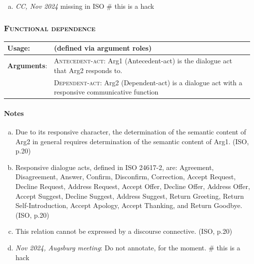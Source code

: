 \documentclass{udisc}
\begin{document}
\begin{itemize}
\begin{enumerate}[a)]
\item \emph{CC, Nov 2024} missing in ISO
\nonstopmode # this is a hack
\end{enumerate}
\errorstopmode


\subsubsection{\textsc{Functional dependence}}

\renewcommand{\arraystretch}{1.4}
\begin{tabularx}{\textwidth}{|l|L|}
\hline

\textbf{Usage}:           &  (defined via argument roles) \\
\hline

\textbf{Arguments}:       &  \textsc{Antecedent-act}: Arg1 (Antecedent-act) is the dialogue act that Arg2 responds to.\\
                          &  \textsc{Dependent-act}: Arg2 (Dependent-act) is a dialogue act with a responsive communicative function \\
\hline

\end{tabularx}

\paragraph{Notes}

\begin{enumerate}[a)]
\item Due to its responsive character, the determination of the semantic content of Arg2 in general requires determination of the semantic content of Arg1. (ISO, p.20)
\item Responsive dialogue acts, defined in ISO 24617-2, are: Agreement, Disagreement, Answer, Confirm, Disconfirm, Correction, Accept Request, Decline Request, Address Request, Accept Offer, Decline Offer, Address Offer, Accept Suggest, Decline Suggest, Address Suggest, Return Greeting, Return Self-Introduction, Accept Apology, Accept Thanking, and Return Goodbye. (ISO, p.20)
\item This relation cannot be expressed by a discourse connective. (ISO, p.20)
\item \emph{Nov 2024, Augsburg meeting}: Do not annotate, for the moment.
\nonstopmode # this is a hack
\end{enumerate}
\errorstopmode



\end{itemize}
\end{document}

